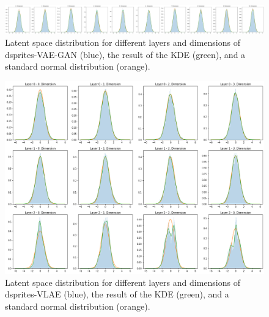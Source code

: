 \begin{figure}[H]
    \centering
    \includegraphics[width=\textwidth]{images/generated_vs_true/dsprites/vae_gan_kde.png}
    \caption[dsprites-VAE-GAN - Estimated Latent Space Distribution]{Latent space distribution for different layers and dimensions of dsprites-\ac{VAE}-\ac{GAN} (blue), the result of the \ac{KDE} (green), and a standard normal distribution (orange).}
\end{figure}


\begin{figure}[H]
    \centering
    \includegraphics[width=\textwidth]{images/generated_vs_true/dsprites/vlae_kde.png}
    \caption[dsprites-VLAE - Estimated Latent Space Distribution]{Latent space distribution for different layers and dimensions of dsprites-\ac{VLAE} (blue), the result of the \ac{KDE} (green), and a standard normal distribution (orange).}
\end{figure}


